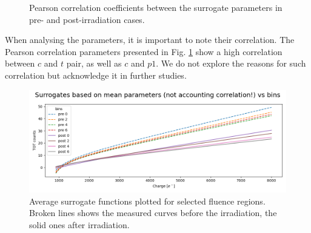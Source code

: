 \begin{figure}[H]
\begin{subfigure}[b]{0.45\textwidth}
  \end{subfigure}
  \caption[Corelation surrogate params]{Pearson correlation coefficients between the surrogate parameters in pre- and post-irradiation cases.}
    \label{plot:corr_matrix}
\end{figure}


When analysing the parameters, it is important to note their correlation.
The Pearson correlation parameters presented in Fig. \ref{plot:corr_matrix} show a high correlation between $c$ and $t$ pair, as well as $c$ and $p1$.
We do not explore the reasons for such correlation but acknowledge it in further studies.

\begin{figure}[H]
\centering
\includegraphics[width=1.\textwidth]{figures/chapter4/surrogates/p2_bins_surrogates.png}
\caption{Average surrogate functions plotted for selected fluence regions. Broken lines shows the measured curves before the irradiation, the solid ones after irradiation.}
\label{fig:example_sur}
\end{figure}

